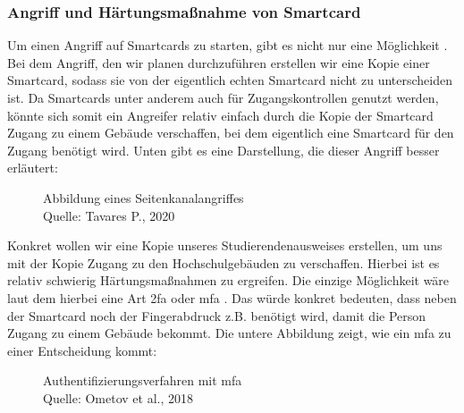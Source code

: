 \subsubsection{Angriff und Härtungsmaßnahme von Smartcard}
Um einen Angriff auf Smartcards zu starten, gibt es nicht nur eine Möglichkeit \cite{refart:TKSK}. Bei dem Angriff, den wir planen 
durchzuführen erstellen wir eine Kopie einer Smartcard, sodass sie von der eigentlich echten Smartcard nicht zu unterscheiden ist.
Da Smartcards unter anderem auch für Zugangskontrollen genutzt werden, könnte sich somit ein Angreifer relativ einfach durch 
die Kopie der Smartcard Zugang zu einem Gebäude verschaffen, bei dem eigentlich eine Smartcard für den Zugang benötigt wird.
Unten gibt es eine Darstellung, die dieser Angriff besser erläutert:


\begin{figure}[H]
  \caption{Abbildung eines Seitenkanalangriffes\\ Quelle: Tavares P., 2020}
  \label{fig:refart_scpt}
\end{figure}


Konkret wollen wir eine Kopie unseres Studierendenausweises erstellen, um uns mit der Kopie Zugang zu den Hochschulgebäuden 
zu verschaffen. Hierbei ist es relativ schwierig Härtungsmaßnahmen zu ergreifen. Die einzige Möglichkeit wäre laut dem
 hierbei eine Art \acrshort{2fa} oder \acrshort{mfa} \cite{refst:2fa}. Das würde konkret bedeuten, dass
neben der Smartcard noch der Fingerabdruck z.B. benötigt wird, damit die Person Zugang zu einem Gebäude bekommt. Die untere
Abbildung zeigt, wie ein \acrshort{mfa} zu einer Entscheidung kommt:


\begin{figure}[H]
  \caption{Authentifizierungsverfahren mit \acrshort{mfa} \\ Quelle: Ometov et al., 2018}
  \label{fig:refart_AOMF}
\end{figure}


